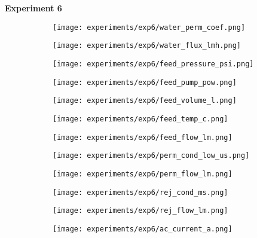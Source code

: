 \documentclass{article}
\begin{document}
    \pagebreak
    
    \textbf{Experiment 6}
    \begin{figure}[H]
        \centering
        \begin{subfigure}{0.48\linewidth}
		    \texttt{[image: experiments/exp6/water\_perm\_coef.png]}
	    \end{subfigure}
	    \begin{subfigure}{0.48\linewidth}
		    \texttt{[image: experiments/exp6/water\_flux\_lmh.png]}
	    \end{subfigure}
	    \begin{subfigure}{0.48\linewidth}
		    \texttt{[image: experiments/exp6/feed\_pressure\_psi.png]}
	    \end{subfigure}
	    \begin{subfigure}{0.48\linewidth}
		    \texttt{[image: experiments/exp6/feed\_pump\_pow.png]}
	    \end{subfigure}
	    \begin{subfigure}{0.48\linewidth}
		    \texttt{[image: experiments/exp6/feed\_volume\_l.png]}
	    \end{subfigure}
	    \begin{subfigure}{0.48\linewidth}
		    \texttt{[image: experiments/exp6/feed\_temp\_c.png]}
	    \end{subfigure}
	    \begin{subfigure}{0.48\linewidth}
		    \texttt{[image: experiments/exp6/feed\_flow\_lm.png]}
	    \end{subfigure}
	    \begin{subfigure}{0.48\linewidth}
		    \texttt{[image: experiments/exp6/perm\_cond\_low\_us.png]}
	    \end{subfigure}
	    \begin{subfigure}{0.48\linewidth}
		    \texttt{[image: experiments/exp6/perm\_flow\_lm.png]}
	    \end{subfigure}
	    \begin{subfigure}{0.48\linewidth}
		    \texttt{[image: experiments/exp6/rej\_cond\_ms.png]}
	    \end{subfigure}
	    \begin{subfigure}{0.48\linewidth}
		    \texttt{[image: experiments/exp6/rej\_flow\_lm.png]}
	    \end{subfigure}
	    \begin{subfigure}{0.48\linewidth}
		    \texttt{[image: experiments/exp6/ac\_current\_a.png]}
	    \end{subfigure}
    \end{figure}
    
\end{document}
